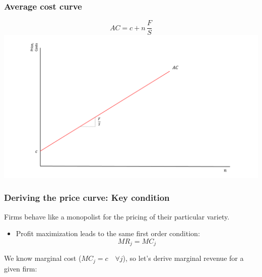\documentclass{beamer}
\begin{document}
\begin{frame}
\frametitle{Average cost curve}
	\footnotesize
		\[ AC =   c + n \, \frac{F}{S} \]
	\includegraphics[scale=0.3]{SL2_5.pdf}
	
\end{frame}

\begin{frame}
	\frametitle{Deriving the price curve: Key condition}

Firms behave like a monopolist for the pricing of their particular variety.
		\begin{itemize}
			\item Profit maximization leads to the same first order condition:
			\begin{equation}
			MR_j=MC_j \nonumber
			\end{equation}
		\end{itemize}

We know marginal cost ($MC_j=c \quad \forall j$), so let's derive marginal revenue for a given firm:

\end{frame}
\end{document}
